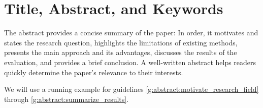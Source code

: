 
\chapter{Title, Abstract, and Keywords}
\label{ch:abstract}

The abstract provides a concise summary of the paper:
In order, it motivates and states the research question, highlights the limitations of existing methods, presents the main approach and its advantages, discusses the results of the evaluation, and provides a brief conclusion.
A well-written abstract helps readers quickly determine the paper's relevance to their interests.

We will use a running example for guidelines \ref{g:abstract:motivate_research_field} through \ref{g:abstract:summarize_results}.









